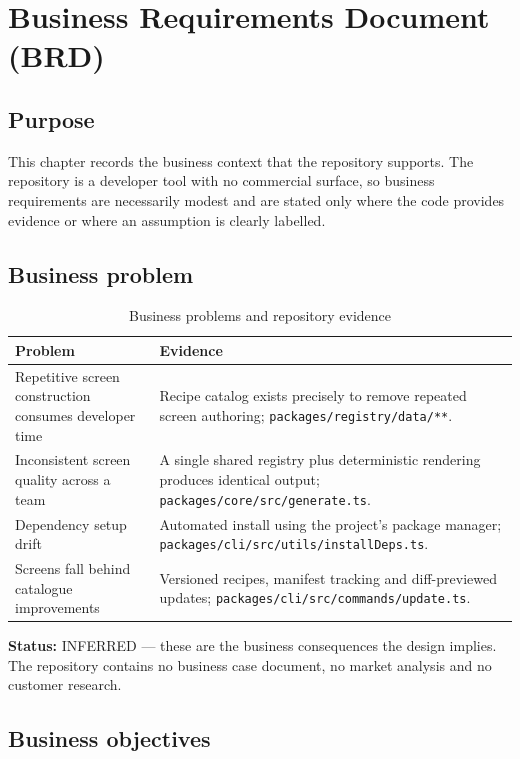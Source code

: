 \chapter{Business Requirements Document (BRD)}
\label{ch:brd}

\section{Purpose}

This chapter records the business context that the repository supports. The
repository is a developer tool with no commercial surface, so business
requirements are necessarily modest and are stated only where the code provides
evidence or where an assumption is clearly labelled.

\section{Business problem}

\begin{longtable}{p{3.4cm}p{11cm}}
\caption{Business problems and repository evidence}\\
\toprule
\textbf{Problem} & \textbf{Evidence} \\
\midrule

Repetitive screen construction consumes developer time & Recipe catalog exists precisely to remove repeated screen authoring; \texttt{packages/registry/data/**}. \\
Inconsistent screen quality across a team & A single shared registry plus deterministic rendering produces identical output; \texttt{packages/core/src/generate.ts}. \\
Dependency setup drift & Automated install using the project's package manager; \texttt{packages/cli/src/utils/installDeps.ts}. \\
Screens fall behind catalogue improvements & Versioned recipes, manifest tracking and diff-previewed updates; \texttt{packages/cli/src/commands/update.ts}. \\
\bottomrule
\end{longtable}

\textbf{Status:} INFERRED --- these are the business consequences the design
implies. The repository contains no business case document, no market analysis
and no customer research.

\section{Business objectives}

